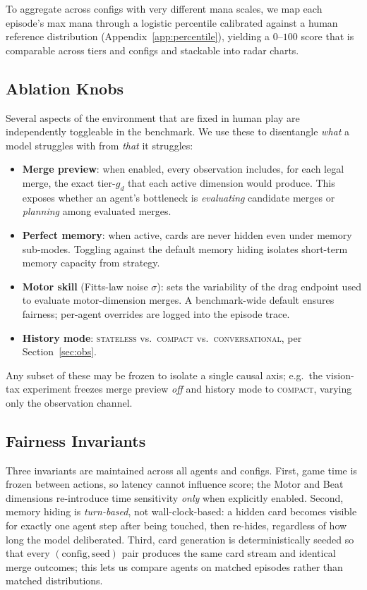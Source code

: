 \documentclass[11pt]{article}
\begin{document}
To aggregate across configs with very different mana scales, we map each
episode's max mana through a logistic percentile calibrated against a
human reference distribution (Appendix~\ref{app:percentile}), yielding a
$0$--$100$ score that is comparable across tiers and configs and stackable
into radar charts.

\subsection{Ablation Knobs}
\label{sec:ablations}

Several aspects of the environment that are fixed in human play are
independently toggleable in the benchmark. We use these to disentangle
\emph{what} a model struggles with from \emph{that} it struggles:

\begin{itemize}
  \item \textbf{Merge preview}: when enabled, every observation includes,
    for each legal merge, the exact tier-$g_d$ that each active dimension
    would produce. This exposes whether an agent's bottleneck is
    \emph{evaluating} candidate merges or \emph{planning} among evaluated
    merges.
  \item \textbf{Perfect memory}: when active, cards are never hidden even
    under memory sub-modes. Toggling against the default memory hiding
    isolates short-term memory capacity from strategy.
  \item \textbf{Motor skill} (Fitts-law noise $\sigma$): sets the
    variability of the drag endpoint used to evaluate motor-dimension
    merges. A benchmark-wide default ensures fairness; per-agent overrides
    are logged into the episode trace.
  \item \textbf{History mode}: \textsc{stateless} vs.\ \textsc{compact} vs.\
    \textsc{conversational}, per Section~\ref{sec:obs}.
\end{itemize}

Any subset of these may be frozen to isolate a single causal axis; e.g.\
the vision-tax experiment freezes merge preview \emph{off} and history mode
to \textsc{compact}, varying only the observation channel.

\subsection{Fairness Invariants}
\label{sec:fairness}

Three invariants are maintained across all agents and configs. First, game
time is frozen between actions, so latency cannot influence score; the
Motor and Beat dimensions re-introduce time sensitivity \emph{only} when
explicitly enabled. Second, memory hiding is \emph{turn-based}, not
wall-clock-based: a hidden card becomes visible for exactly one agent step
after being touched, then re-hides, regardless of how long the model
deliberated. Third, card generation is deterministically seeded so that
every $(\text{config}, \text{seed})$ pair produces the same card stream
and identical merge outcomes; this lets us compare agents on matched
episodes rather than matched distributions.
\end{document}
